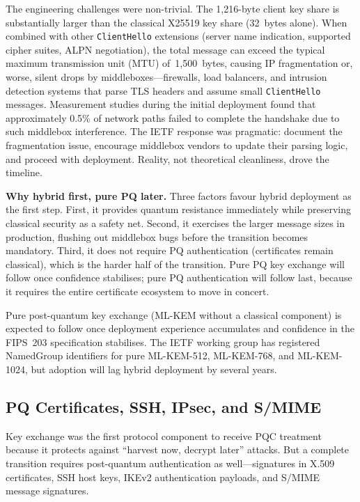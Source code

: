The engineering challenges were non-trivial. The 1,216-byte client key share is substantially larger than the classical X25519 key share (32~bytes alone). When combined with other \texttt{ClientHello} extensions (server name indication, supported cipher suites, ALPN negotiation), the total message can exceed the typical maximum transmission unit (MTU) of~1,500~bytes, causing IP fragmentation or, worse, silent drops by middleboxes---firewalls, load balancers, and intrusion detection systems that parse TLS headers and assume small \texttt{ClientHello} messages. Measurement studies during the initial deployment found that approximately 0.5\% of network paths failed to complete the handshake due to such middlebox interference. The IETF response was pragmatic: document the fragmentation issue, encourage middlebox vendors to update their parsing logic, and proceed with deployment. Reality, not theoretical cleanliness, drove the timeline.

\begin{svgraybox}
\textbf{Why hybrid first, pure PQ later.} Three factors favour hybrid deployment as the first step. First, it provides quantum resistance immediately while preserving classical security as a safety net. Second, it exercises the larger message sizes in production, flushing out middlebox bugs before the transition becomes mandatory. Third, it does not require PQ authentication (certificates remain classical), which is the harder half of the transition. Pure PQ key exchange will follow once confidence stabilises; pure PQ authentication will follow last, because it requires the entire certificate ecosystem to move in concert.
\end{svgraybox}

Pure post-quantum key exchange (ML-KEM without a classical component) is expected to follow once deployment experience accumulates and confidence in the FIPS~203 specification stabilises. The IETF working group has registered NamedGroup identifiers for pure ML-KEM-512, ML-KEM-768, and ML-KEM-1024, but adoption will lag hybrid deployment by several years.

\subsection{PQ Certificates, SSH, IPsec, and S/MIME}
\label{subsec:pq-protocols}

Key exchange was the first protocol component to receive PQC treatment because it protects against ``harvest now, decrypt later'' attacks. But a complete transition requires post-quantum authentication as well---signatures in X.509 certificates, SSH host keys, IKEv2 authentication payloads, and S/MIME message signatures.

